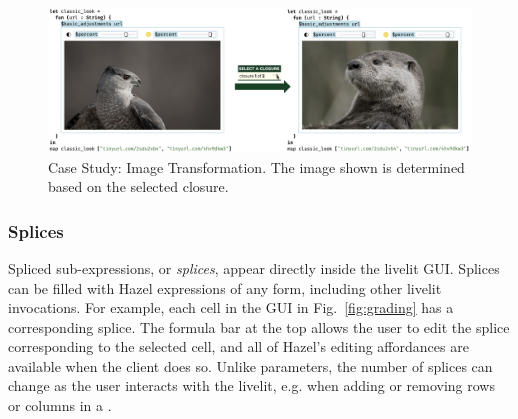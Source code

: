 \begin{figure}
  \begin{center}
    \includegraphics[width=40pc]{img-filter.png}
  \end{center}
  \caption{Case Study: Image Transformation. The image shown is determined based on the selected closure.}
  \label{fig:img-transformation}
\end{figure}


\subsubsection{Splices}\label{sec:splices}
Spliced sub-expressions, or \emph{splices}, appear directly inside the livelit GUI.
Splices can be filled with Hazel expressions of any form, including other livelit invocations.
For example, each cell in the  GUI in Fig.~\ref{fig:grading}
has a corresponding splice. The formula bar at the top
allows the user to edit the splice corresponding to the selected cell,
and all of Hazel's editing affordances are available when the client does so.
Unlike parameters, the number of splices can change
as the user interacts with the livelit, e.g. when adding or removing rows or columns in a .


